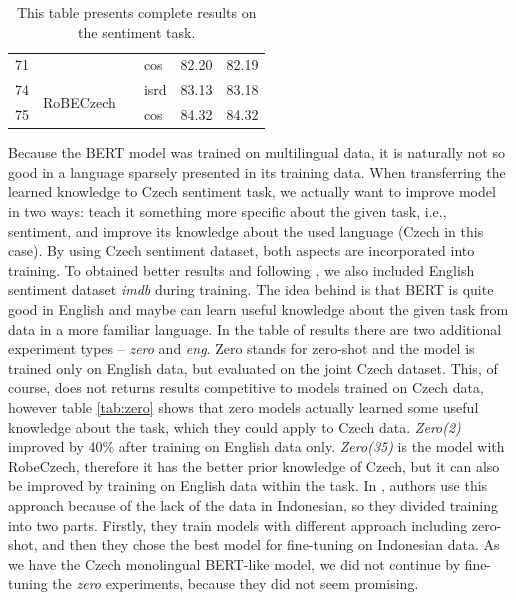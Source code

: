 \begin{table}[]
{\begin{tabular}{|l|l|l|l||ll|}
71 &                            &                           & cos                   & 82.20   & 82.19 \\ \cline{1-2} \cline{4-6}
74 & \multirow{2}{*}{RoBECzech} &                           & isrd                  & 83.13   & 83.18 \\ \cline{1-1} \cline{4-6}
75 &                            &                           & cos                   & 84.32   & 84.32 \\ \hline
\end{tabular}}
\caption[Complete results for the sentiment analysis]{This table presents complete results on the sentiment task.}
\label{tab:res_all_sent}
\end{table}

\par
Because the BERT model was trained on multilingual data, it is naturally not so good in a language sparsely presented in its training data. When transferring the learned knowledge to Czech sentiment task, we actually want to improve model in two ways: teach it something more specific about the given task, i.e., sentiment, and improve its knowledge about the used language (Czech in this case). By using Czech sentiment dataset, both aspects are incorporated into training. To obtained better results and following \citet{putra}, we also included English sentiment dataset \textit{imdb} during training. The idea behind is that BERT is quite good in English and maybe can learn useful knowledge about the given task from data in a more familiar language. In the table of results there are two additional experiment types -- \textit{zero} and \textit{eng}. Zero stands for zero-shot and the model is trained only on English data, but evaluated on the joint Czech dataset. This, of course, does not returns results competitive to models trained on Czech data, however table \ref{tab:zero} shows that zero models actually learned some useful knowledge about the task, which they could apply to Czech data. \textit{Zero(2)} improved by 40\% after training on English data only. \textit{Zero(35)} is the model with RobeCzech, therefore it has the better prior knowledge of Czech, but it can also be improved by training on English data within the task. In \citet{putra}, authors use this approach because of the lack of the data in Indonesian, so they divided training into two parts. Firstly, they train models with different approach including zero-shot, and then they chose the best model for fine-tuning on Indonesian data. As we have the Czech monolingual BERT-like model, we did not continue by fine-tuning the \textit{zero} experiments, because they did not seem promising.

